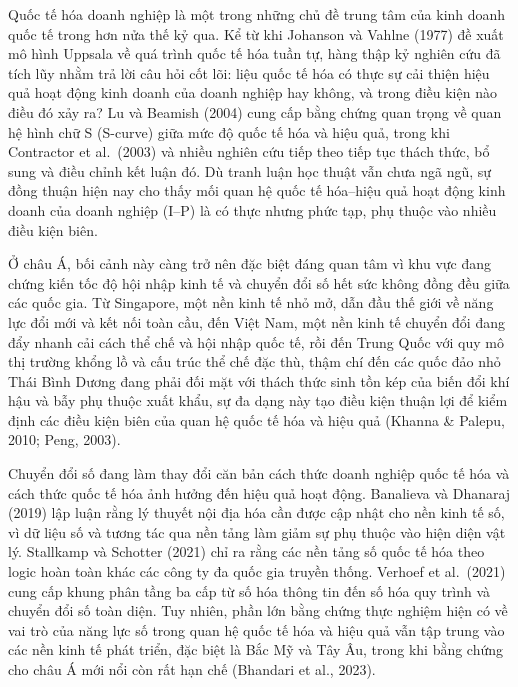 \documentclass[
  a4paper,
  13pt]{extreport}
\begin{document}
Quốc tế hóa doanh nghiệp là một trong những chủ đề trung tâm của kinh
doanh quốc tế trong hơn nửa thế kỷ qua. Kể từ khi Johanson và Vahlne
(1977) đề xuất mô hình Uppsala về quá trình quốc tế hóa tuần tự, hàng
thập kỷ nghiên cứu đã tích lũy nhằm trả lời câu hỏi cốt lõi: liệu quốc
tế hóa có thực sự cải thiện hiệu quả hoạt động kinh doanh của doanh
nghiệp hay không, và trong điều kiện nào điều đó xảy ra? Lu và Beamish
(2004) cung cấp bằng chứng quan trọng về quan hệ hình chữ S (S-curve)
giữa mức độ quốc tế hóa và hiệu quả, trong khi Contractor et al.~(2003)
và nhiều nghiên cứu tiếp theo tiếp tục thách thức, bổ sung và điều chỉnh
kết luận đó. Dù tranh luận học thuật vẫn chưa ngã ngũ, sự đồng thuận
hiện nay cho thấy mối quan hệ quốc tế hóa--hiệu quả hoạt động kinh doanh
của doanh nghiệp (I--P) là có thực nhưng phức tạp, phụ thuộc vào nhiều
điều kiện biên.

Ở châu Á, bối cảnh này càng trở nên đặc biệt đáng quan tâm vì khu vực
đang chứng kiến tốc độ hội nhập kinh tế và chuyển đổi số hết sức không
đồng đều giữa các quốc gia. Từ Singapore, một nền kinh tế nhỏ mở, dẫn
đầu thế giới về năng lực đổi mới và kết nối toàn cầu, đến Việt Nam, một
nền kinh tế chuyển đổi đang đẩy nhanh cải cách thể chế và hội nhập quốc
tế, rồi đến Trung Quốc với quy mô thị trường khổng lồ và cấu trúc thể
chế đặc thù, thậm chí đến các quốc đảo nhỏ Thái Bình Dương đang phải đối
mặt với thách thức sinh tồn kép của biến đổi khí hậu và bẫy phụ thuộc
xuất khẩu, sự đa dạng này tạo điều kiện thuận lợi để kiểm định các điều
kiện biên của quan hệ quốc tế hóa và hiệu quả (Khanna \& Palepu, 2010;
Peng, 2003).

Chuyển đổi số đang làm thay đổi căn bản cách thức doanh nghiệp quốc tế
hóa và cách thức quốc tế hóa ảnh hưởng đến hiệu quả hoạt động. Banalieva
và Dhanaraj (2019) lập luận rằng lý thuyết nội địa hóa cần được cập nhật
cho nền kinh tế số, vì dữ liệu số và tương tác qua nền tảng làm giảm sự
phụ thuộc vào hiện diện vật lý. Stallkamp và Schotter (2021) chỉ ra rằng
các nền tảng số quốc tế hóa theo logic hoàn toàn khác các công ty đa
quốc gia truyền thống. Verhoef et al.~(2021) cung cấp khung phân tầng ba
cấp từ số hóa thông tin đến số hóa quy trình và chuyển đổi số toàn diện.
Tuy nhiên, phần lớn bằng chứng thực nghiệm hiện có về vai trò của năng
lực số trong quan hệ quốc tế hóa và hiệu quả vẫn tập trung vào các nền
kinh tế phát triển, đặc biệt là Bắc Mỹ và Tây Âu, trong khi bằng chứng
cho châu Á mới nổi còn rất hạn chế (Bhandari et al., 2023).
\end{document}
